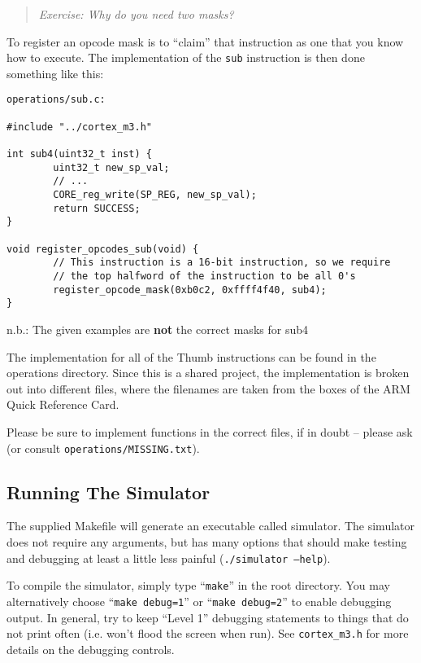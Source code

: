 \documentclass{article}
\begin{document}
\begin{quote}
  {\it Exercise: Why do you need two masks?}
\end{quote}

To register an opcode mask is to ``claim'' that instruction as one that you
know how to execute. The implementation of the {\tt sub} instruction is then
done something like this:

\begin{verbatim}
operations/sub.c:

#include "../cortex_m3.h"

int sub4(uint32_t inst) {
        uint32_t new_sp_val;
        // ...
        CORE_reg_write(SP_REG, new_sp_val);
        return SUCCESS;
}

void register_opcodes_sub(void) {
        // This instruction is a 16-bit instruction, so we require
        // the top halfword of the instruction to be all 0's
        register_opcode_mask(0xb0c2, 0xffff4f40, sub4);
}
\end{verbatim}

n.b.: The given examples are {\bf not} the correct masks for sub4

\vspace{5mm}

The implementation for all of the Thumb instructions can be found in the
operations directory. Since this is a shared project, the implementation is
broken out into different files, where the filenames are taken from the boxes
of the ARM Quick Reference Card.

Please be sure to implement functions in the correct files, if in doubt --
please ask (or consult {\tt operations/MISSING.txt}).


\subsection{Running The Simulator}

The supplied Makefile will generate an executable called simulator. The
simulator does not require any arguments, but has many options that should
make testing and debugging at least a little less painful ({\tt ./simulator
--help}).

To compile the simulator, simply type ``{\tt make}'' in the root directory.
You may alternatively choose ``{\tt make debug=1}'' or ``{\tt make debug=2}'' to
enable debugging output. In general, try to keep ``Level 1'' debugging
statements to things that do not print often (i.e. won't flood the screen when
run). See {\tt cortex\_m3.h} for more details on the debugging controls.
\end{document}
